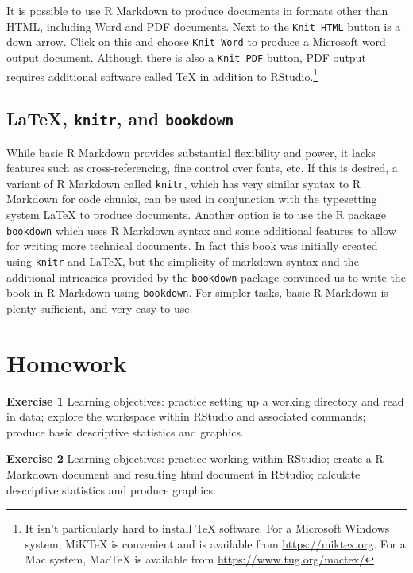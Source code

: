 \documentclass[]{krantz}
\begin{document}
It is possible to use R Markdown to produce documents in formats other than HTML, including Word and PDF documents. Next to the \texttt{Knit\ HTML} button is a down arrow. Click on this and choose \texttt{Knit\ Word} to produce a Microsoft word output document. Although there is also a \texttt{Knit\ PDF} button, PDF output requires additional software called TeX in addition to RStudio.\footnote{It isn't particularly hard to install TeX software. For a Microsoft Windows system, MiKTeX is convenient and is available from \url{https://miktex.org}. For a Mac system, MacTeX is available from \url{https://www.tug.org/mactex/}}

\hypertarget{latex-knitr-and-bookdown}{%
\subsection{\texorpdfstring{LaTeX, \texttt{knitr}, and \texttt{bookdown}}{LaTeX, knitr, and bookdown}}\label{latex-knitr-and-bookdown}}

While basic R Markdown provides substantial flexibility and power, it lacks features such as cross-referencing, fine control over fonts, etc. If this is desired, a variant of R Markdown called \texttt{knitr}, which has very similar syntax to R Markdown for code chunks, can be used in conjunction with the typesetting system LaTeX to produce documents. Another option is to use the R package \texttt{bookdown} which uses R Markdown syntax and some additional features to allow for writing more technical documents. In fact this book was initially created using \texttt{knitr} and LaTeX, but the simplicity of markdown syntax and the additional intricacies provided by the \texttt{bookdown} package convinced us to write the book in R Markdown using \texttt{bookdown}. For simpler tasks, basic R Markdown is plenty sufficient, and very easy to use.

\hypertarget{homework}{%
\section{Homework}\label{homework}}

\textbf{Exercise 1} Learning objectives: practice setting up a working directory and read in data; explore the workspace within RStudio and associated commands; produce basic descriptive statistics and graphics.

\textbf{Exercise 2} Learning objectives: practice working within RStudio; create a R Markdown document and resulting html document in RStudio; calculate descriptive statistics and produce graphics.
\end{document}

